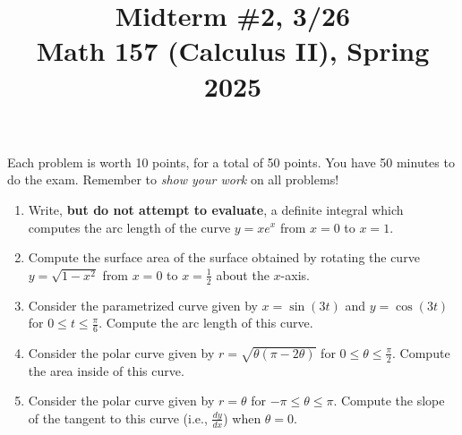 \documentclass[11pt]{article}
\title{Midterm \#2, 3/26 \\ Math 157 (Calculus II), Spring 2025}
\date{}
\begin{document}
\maketitle

\thispagestyle{empty}

\vspace{-1cm}

Each problem is worth 10 points, for a total of 50 points. You have 50 minutes to do the exam. Remember to \emph{show your work} on all problems!

\begin{enumerate}
\item Write, {\bf but do not attempt to evaluate}, a definite integral which computes the arc length of the curve $y=xe^{x}$ from $x=0$ to $x=1$.
\item Compute the surface area of the surface obtained by rotating the curve $y=\sqrt{1-x^2}$ from $x=0$ to $x=\frac{1}{2}$ about the $x$-axis.
\item Consider the parametrized curve given by $x=\sin(3t)$ and $y=\cos(3t)$ for $0\leq t \leq \frac{\pi}{6}$. Compute the arc length of this curve.
\item Consider the polar curve given by $r=\sqrt{\theta (\pi-2\theta)}$ for $0 \leq \theta \leq \frac{\pi}{2}$. Compute the area inside of this curve.
\item Consider the polar curve given by $r=\theta$ for $-\pi \leq \theta \leq \pi$. Compute the slope of the tangent to this curve (i.e., $\frac{dy}{dx}$) when $\theta=0$.
\end{enumerate}
\end{document}
